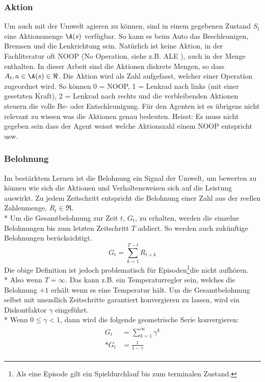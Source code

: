 \documentclass[a4paper,titlepage]{article}
\numberwithin{equation}{section} %
\begin{document}
\subsubsection{Aktion} \label{section:aktion}
Um auch mit der Umwelt agieren zu können, sind in einem gegebenen Zustand $S_{t}$ eine Aktionsmenge $\A(s)$ verfügbar. So kann es beim Auto das Beschleunigen, Bremsen und die Lenkrichtung sein. Natürlich ist keine Aktion, in der Fachliteratur oft NOOP (No Operation, siehe z.B. ALE \cite{bellemareArcadeLearningEnvironment2013}), auch in der Menge enthalten. In dieser Arbeit sind die Aktionen diskrete Mengen, so dass $A_{t}, a \in \A(s) \in \Re$. Die Aktion wird als Zahl aufgefasst, welcher einer Operation zugeordnet wird. So können 0 = NOOP, 1 = Lenkrad nach links (mit einer gesetzten Kraft), 2 = Lenkrad nach rechts und die verbleibenden Aktionen steuern die volle Be- oder Entschleunigung.
Für den Agenten ist es übrigens nicht relevant zu wissen was die Aktionen genau bedeuten. Heisst: Es muss nicht gegeben sein dass der Agent weisst welche Aktionszahl einem NOOP entspricht usw.

\subsubsection{Belohnung} \label{section:belohnung}
Im bestärktem Lernen ist die Belohnung ein Signal der Umwelt, um bewerten zu können wie sich die Aktionen und Verhaltensweisen sich auf die Leistung auswirkt. Zu jedem Zeitschritt entspricht die Belohnung einer Zahl aus der reellen Zahlenmenge, $R_t \in \Re$.\\*
Um die Gesamtbelohnung zur Zeit $t$, $G_t$, zu erhalten, werden die einzelne Belohnungen bis zum letzten Zeitschritt $T$ addiert. So werden auch zukünftige Belohnungen berücksichtigt.
\begin{equation}\label{eqn:gesamtbelohnung_undiskontiert}
	G_t =\sum_{k=1}^{T-t}R_{t+k}
\end{equation}
Die obige Definition ist jedoch problematisch für Episoden\footnote{Als eine Episode gilt ein Spieldurchlauf bis zum terminalen Zustand. }die nicht aufhören. \\*
Also wenn $T = \infty$. Das kann z.B. ein Temperaturregler sein, welches die Belohnung $+1$ erhält wenn es eine Temperatur hält. Um die Gesamtbelohnung selbst mit unendlich Zeitschritte garantiert konvergieren zu lassen, wird ein Diskontfaktor $\gamma$ eingeführt.\\* Wenn $0 \leq \gamma < 1$, dann wird die folgende geometrische Serie konvergieren:
\begin{align}
	\begin{split} \label{eqn:geometric_series}
		G_t &= \sum_{k=1}^{\infty}\gamma^{k} \\*
		G_t &= \frac{1}{1-\gamma}
	\end{split}
\end{align}
\end{document}
